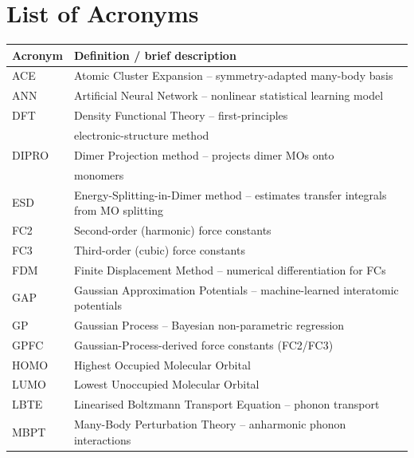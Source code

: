 \thispagestyle{plain}
\section*{\Huge List of Acronyms}%
{}
\begin{center}
\begin{tabular}{p{2.2cm} p{10.5cm}}
\textbf{\large Acronym} & \textbf{\large Definition / brief description}\\
\midrule\midrule
ACE   & Atomic Cluster Expansion – symmetry-adapted many-body basis\\
ANN   & Artificial Neural Network – nonlinear statistical learning model\\
DFT   & Density Functional Theory – first-principles \\
      & electronic-structure method\\
DIPRO & Dimer Projection method – projects dimer MOs onto \\
      & monomers\\
ESD   & Energy-Splitting-in-Dimer method – estimates transfer integrals from MO splitting\\
FC2   & Second-order (harmonic) force constants\\
FC3   & Third-order (cubic) force constants\\
FDM   & Finite Displacement Method – numerical differentiation for FCs\\
GAP   & Gaussian Approximation Potentials – machine-learned interatomic potentials\\
GP    & Gaussian Process – Bayesian non-parametric regression\\
GPFC  & Gaussian-Process-derived force constants (FC2/FC3)\\
HOMO  & Highest Occupied Molecular Orbital\\
LUMO  & Lowest Unoccupied Molecular Orbital\\
LBTE  & Linearised Boltzmann Transport Equation – phonon transport\\
MBPT  & Many-Body Perturbation Theory – anharmonic phonon interactions\\
\bottomrule
\end{tabular}
\end{center}
